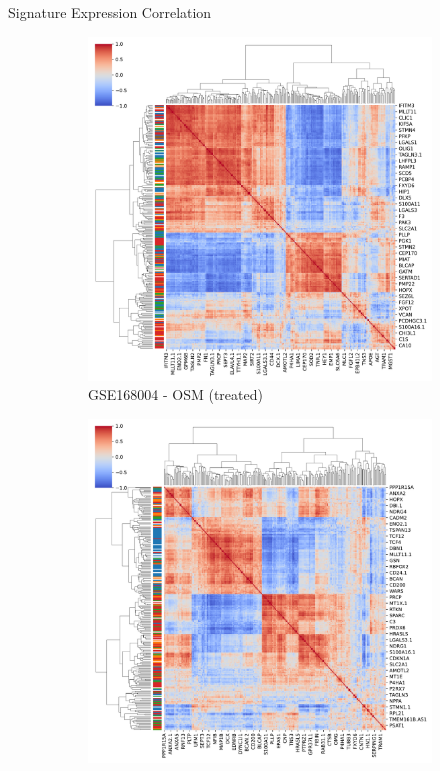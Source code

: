 \documentclass[aspectratio=169,9pt]{beamer}
\begin{document}
    \begin{frame}{Signature Expression Correlation}
        \begin{adjustwidth}{-5cm}{-5cm}
            \centering
            \begin{figure}\ContinuedFloat
                \centering
                \begin{subfigure}[b]{0.38\textwidth}
                    \centering
                    \includegraphics[width=\textwidth]{OSM_celllines_Corrplot_coloured}
                    \caption{GSE168004 - OSM (treated)}
                \end{subfigure}
                \begin{subfigure}[b]{0.38\textwidth}
                    \centering
                    \includegraphics[width=\textwidth]{mgg23_Corrplot_coloured}

\end{subfigure}
\end{figure}
\end{adjustwidth}
\end{frame}
\end{document}
